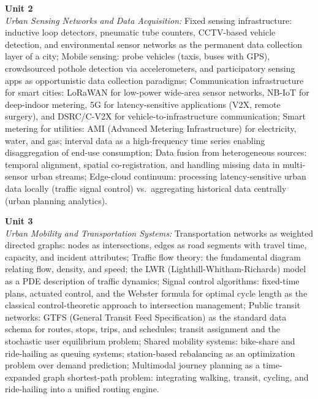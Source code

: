 \noindent\textbf{Unit 2} \\
\textit{Urban Sensing Networks and Data Acquisition:} Fixed sensing infrastructure: inductive loop detectors, pneumatic tube counters, CCTV-based vehicle detection, and environmental sensor networks as the permanent data collection layer of a city; Mobile sensing: probe vehicles (taxis, buses with GPS), crowdsourced pothole detection via accelerometers, and participatory sensing apps as opportunistic data collection paradigms; Communication infrastructure for smart cities: LoRaWAN for low-power wide-area sensor networks, NB-IoT for deep-indoor metering, 5G for latency-sensitive applications (V2X, remote surgery), and DSRC/C-V2X for vehicle-to-infrastructure communication; Smart metering for utilities: AMI (Advanced Metering Infrastructure) for electricity, water, and gas; interval data as a high-frequency time series enabling disaggregation of end-use consumption; Data fusion from heterogeneous sources: temporal alignment, spatial co-registration, and handling missing data in multi-sensor urban streams; Edge-cloud continuum: processing latency-sensitive urban data locally (traffic signal control) vs.\ aggregating historical data centrally (urban planning analytics).

\vspace{0.3cm}

\noindent\textbf{Unit 3} \\
\textit{Urban Mobility and Transportation Systems:} Transportation networks as weighted directed graphs: nodes as intersections, edges as road segments with travel time, capacity, and incident attributes; Traffic flow theory: the fundamental diagram relating flow, density, and speed; the LWR (Lighthill-Whitham-Richards) model as a PDE description of traffic dynamics; Signal control algorithms: fixed-time plans, actuated control, and the Webster formula for optimal cycle length as the classical control-theoretic approach to intersection management; Public transit networks: GTFS (General Transit Feed Specification) as the standard data schema for routes, stops, trips, and schedules; transit assignment and the stochastic user equilibrium problem; Shared mobility systems: bike-share and ride-hailing as queuing systems; station-based rebalancing as an optimization problem over demand prediction; Multimodal journey planning as a time-expanded graph shortest-path problem: integrating walking, transit, cycling, and ride-hailing into a unified routing engine.

\vspace{0.3cm}

